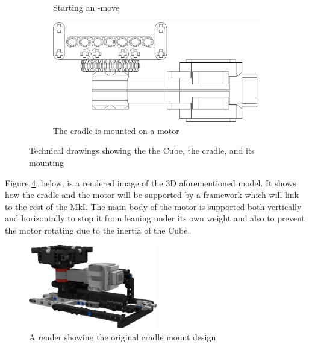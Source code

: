 \documentclass{report}
\newcommand{\move}[1]{\uppercase{\texttt{\formatmovesnospace{#1}}}-move}
\begin{document}
\begin{figure}[H]
\begin{subfigure}[b]{0.2\textwidth}
    		\caption{Starting an \move{x}}
    		\label{fig:dwgCradleCurvedEdgeTilted}
    	\end{subfigure}
	    \hspace{10mm}
	    \begin{subfigure}[b]{0.4\textwidth}
	    	\includegraphics[width=\textwidth]{Resources/Images/dwgCradleProfileV1.png}
	    	\caption{The cradle is mounted on a motor}
	    	\label{fig:dwgCradleProfileV1}
	    \end{subfigure}
    	\caption{Technical drawings showing the the Cube, the cradle, and its mounting}
    	\label{fig:CradleDrawings}
    \end{figure}    
    
    Figure \ref{fig:rdrCradleMountedRotor}, below, is a rendered image of the 3D aforementioned model. It shows how the cradle and the motor will be supported by a framework which will link to the rest of the MkI. The main body of the motor is supported both vertically and horizontally to stop it from leaning under its own weight and also to prevent the motor rotating due to the inertia of the Cube.
    
    \begin{figure}[H]
    	\centering
   		\includegraphics[width=0.5\textwidth]{Resources/Images/rdrCradleMountedRotor.png}
   		\caption{A render showing the original cradle mount design}
   		\label{fig:rdrCradleMountedRotor}
    \end{figure}
    
\end{document}
